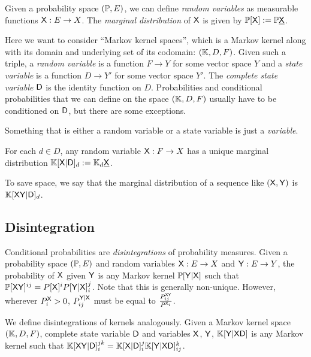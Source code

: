 Given a probability space $(\mathbb{P},E)$, we can define \emph{random variables} as measurable functions $\mathsf{X}:E\to X$. The \emph{marginal distribution} of $\mathsf{X}$ is given by $\mathbb{P}[\mathsf{X}]:=\mathbb{P}\underline{\mathsf{X}}$. 

Here we want to consider ``Markov kernel spaces'', which is a Markov kernel along with its domain and underlying set of its codomain: $(\mathbb{K},D,F)$. Given such a triple, a \emph{random variable} is a function $F\to Y$ for some vector space $Y$ and a \emph{state variable} is a function $D\to Y'$ for some vector space $Y'$. The \emph{complete state variable} $\mathsf{D}$ is the identity function on $D$. Probabilities and conditional probabilities that we can define on the space $(\mathbb{K},D,F)$ usually have to be conditioned on $\mathsf{D}$, but there are some exceptions.

Something that is either a random variable or a state variable is just a \emph{variable}.


For each $d\in D$, any random variable $\mathsf{X}:F\to X$ has a unique marginal distribution $\mathbb{K}[\mathsf{X}|\mathsf{D}]_d:=\mathbb{K}_d\underline{\mathsf{X}}$. 

To save space, we say that the marginal distribution of a sequence like $(\mathsf{X},\mathsf{Y})$ is $\mathbb{K}[\mathsf{XY}|\mathsf{D}]_d$.

\subsection{Disintegration}\label{ssec:disintegration}

Conditional probabilities are \emph{disintegrations} of probability measures. Given a probability space $(\mathbb{P},E)$ and random variables $\mathsf{X}:E\to X$ and $\mathsf{Y}:E\to Y$, the probability of $\mathsf{X}$ given $\mathsf{Y}$ is any Markov kernel $\mathbb{P}[\mathsf{Y}|\mathsf{X}]$ such that $\mathbb{P}[\mathsf{XY}]^{ij}= P[\mathsf{X}]^i P[\mathsf{Y}|\mathsf{X}]_i^j$. Note that this is generally non-unique. However, wherever $P^{\mathsf{X}}_i>0$, $P^{\mathsf{Y}|\mathsf{X}}_{ij}$ must be equal to $\frac{P^{\mathsf{XY}}_{ij}}{P^{\mathsf{X}_i}}$.

We define disintegrations of kernels analogously. Given a Markov kernel space $(\mathbb{K},D,F)$, complete state variable $\mathsf{D}$ and variables $\mathsf{X}$, $\mathsf{Y}$, $\mathbb{K}[\mathsf{Y}|\mathsf{X}\mathsf{D}]$ is any Markov kernel such that $\mathbb{K}[\mathsf{XY}|\mathsf{D}]_i^{jk} = \mathbb{K}[\mathsf{X}|\mathsf{D}]_{i}^j \mathbb{K}[\mathsf{Y}|\mathsf{X}\mathsf{D}]_{ij}^k$. 

